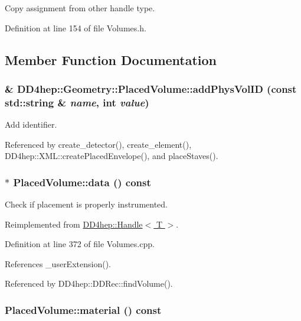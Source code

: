 Copy assignment from other handle type. 

Definition at line 154 of file Volumes.h.

\subsection{Member Function Documentation}
\hypertarget{class_d_d4hep_1_1_geometry_1_1_placed_volume_a461228a5c2a8347d0445d64a351e117a}{
\subsubsection[{addPhysVolID}]{\& DD4hep::Geometry::PlacedVolume::addPhysVolID (const std::string \& {\em name}, \/  int {\em value})}}
\label{class_d_d4hep_1_1_geometry_1_1_placed_volume_a461228a5c2a8347d0445d64a351e117a}


Add identifier. 

Referenced by create\_\-detector(), create\_\-element(), DD4hep::XML::createPlacedEnvelope(), and placeStaves().\hypertarget{class_d_d4hep_1_1_geometry_1_1_placed_volume_ac13225b8f8408419cc0dd096f59cc934}{
\subsubsection[{data}]{ $\ast$ PlacedVolume::data () const}}
\label{class_d_d4hep_1_1_geometry_1_1_placed_volume_ac13225b8f8408419cc0dd096f59cc934}


Check if placement is properly instrumented. 

Reimplemented from \hyperlink{class_d_d4hep_1_1_handle_a821fe41f46aa5ce97cfb04a6a60e5cd5}{DD4hep::Handle$<$ T $>$}.

Definition at line 372 of file Volumes.cpp.

References \_\-userExtension().

Referenced by DD4hep::DDRec::findVolume().\hypertarget{class_d_d4hep_1_1_geometry_1_1_placed_volume_a15e211be65f8a1eacb9c2abcb21d27f7}{
\subsubsection[{material}]{ PlacedVolume::material () const}}
\label{class_d_d4hep_1_1_geometry_1_1_placed_volume_a15e211be65f8a1eacb9c2abcb21d27f7}


